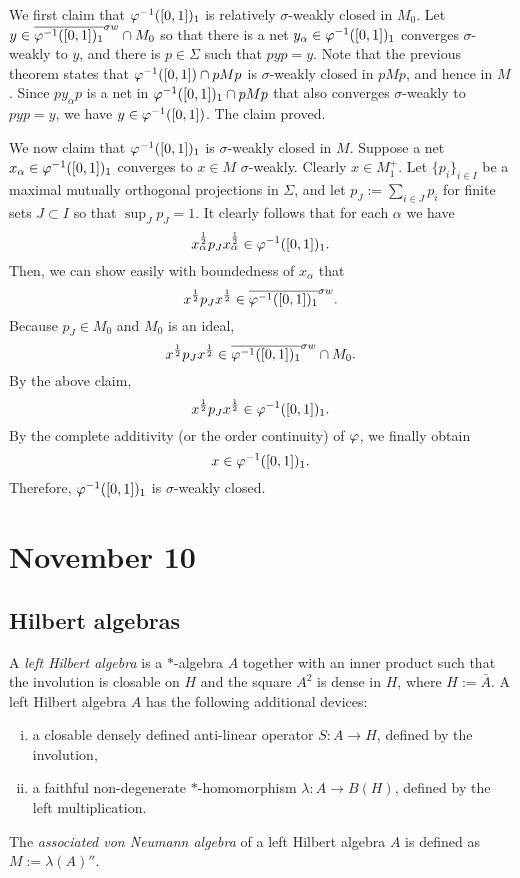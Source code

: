\documentclass{../../../small}
\begin{document}
\begin{pf}
We first claim that $\varphi^{-1}([0,1])_1$ is relatively $\sigma$-weakly closed in $M_0$.
Let $y\in\overline{\varphi^{-1}([0,1])_1}^{\sigma w}\cap M_0$ so that there is a net $y_\alpha\in\varphi^{-1}([0,1])_1$ converges $\sigma$-weakly to $y$, and there is $p\in\Sigma$ such that $pyp=y$.
Note that the previous theorem states that $\varphi^{-1}([0,1])\cap pMp$ is $\sigma$-weakly closed in $pMp$, and hence in $M$.
Since $py_\alpha p$ is a net in $\varphi^{-1}([0,1])_1\cap pMp$ that also converges $\sigma$-weakly to $pyp=y$, we have $y\in\varphi^{-1}([0,1])$.
The claim proved.

We now claim that $\varphi^{-1}([0,1])_1$ is $\sigma$-weakly closed in $M$.
Suppose a net $x_\alpha\in\varphi^{-1}([0,1])_1$ converges to $x\in M$ $\sigma$-weakly.
Clearly $x\in M_1^+$.
Let $\{p_i\}_{i\in I}$ be a maximal mutually orthogonal projections in $\Sigma$, and let $p_J:=\sum_{i\in J}p_i$ for finite sets $J\subset I$ so that $\sup_Jp_J=1$.
It clearly follows that for each $\alpha$ we have
\[x_\alpha^{\frac12}p_Jx_\alpha^{\frac12}\in\varphi^{-1}([0,1])_1.\]
Then, we can show easily with boundedness of $x_\alpha$ that
\[x^{\frac12}p_Jx^{\frac12}\in\overline{\varphi^{-1}([0,1])_1}^{\sigma w}.\]
Because $p_J\in M_0$ and $M_0$ is an ideal, 
\[x^{\frac12}p_Jx^{\frac12}\in\overline{\varphi^{-1}([0,1])_1}^{\sigma w}\cap M_0.\]
By the above claim,
\[x^{\frac12}p_Jx^{\frac12}\in\varphi^{-1}([0,1])_1.\]
By the complete additivity (or the order continuity) of $\varphi$, we finally obtain
\[x\in\varphi^{-1}([0,1])_1.\]
Therefore, $\varphi^{-1}([0,1])_1$ is $\sigma$-weakly closed.
\end{pf}





\newpage
\section{November 10}
\subsection{Hilbert algebras}

\begin{defn}
A \emph{left Hilbert algebra} is a $*$-algebra $A$ together with an inner product such that the involution is closable on $H$ and the square $A^2$ is dense in $H$, where $H:=\bar A$.
A left Hilbert algebra $A$ has the following additional devices:
\begin{enumerate}[(i)]
\item a closable densely defined anti-linear operator $S:A\to H$, defined by the involution,
\item a faithful non-degenerate $*$-homomorphism $\lambda:A\to B(H)$, defined by the left multiplication.
\end{enumerate}
The \emph{associated von Neumann algebra} of a left Hilbert algebra $A$ is defined as $M:=\lambda(A)''$.
\end{defn}
\end{document}
